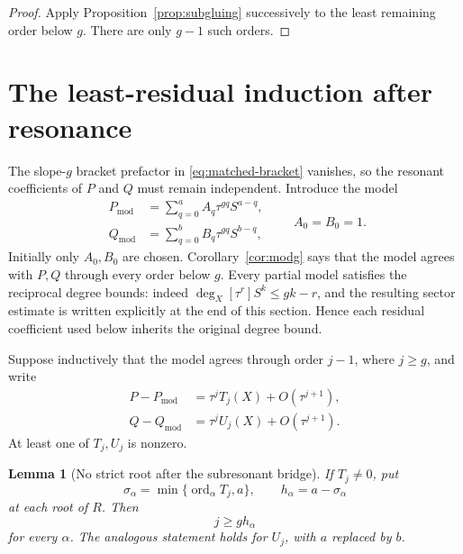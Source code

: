 \documentclass[11pt]{article}
\newtheorem{lemma}[theorem]{Lemma}
\theoremstyle{definition}
\theoremstyle{remark}
\newcommand{\ord}{\operatorname{ord}}
\begin{document}
\begin{proof}
Apply Proposition~\ref{prop:subgluing} successively to the least
remaining order below \(g\).  There are only \(g-1\) such orders.
\end{proof}

\section{The least-residual induction after resonance}
\label{sec:resonance}

The slope-\(g\) bracket prefactor in
\eqref{eq:matched-bracket} vanishes, so the resonant coefficients of
\(P\) and \(Q\) must remain independent.  Introduce the model
\begin{equation}
\begin{aligned}
 P_{\mathrm{mod}}
 &=\sum_{q=0}^{a}A_q\tau^{gq}S^{a-q},\\
 Q_{\mathrm{mod}}
 &=\sum_{q=0}^{b}B_q\tau^{gq}S^{b-q},
\end{aligned}
\qquad A_0=B_0=1.
\label{eq:model}
\end{equation}
Initially only \(A_0,B_0\) are chosen.  Corollary~\ref{cor:modg}
says that the model agrees with \(P,Q\) through every order below
\(g\).  Every partial model satisfies the reciprocal degree bounds:
indeed \(\deg_X[\tau^r]S^k\leq gk-r\), and the resulting sector
estimate is written explicitly at the end of this section.  Hence each
residual coefficient used below inherits the original degree bound.

Suppose inductively that the model agrees through order \(j-1\), where
\(j\geq g\), and write
\begin{equation}
\begin{aligned}
 P-P_{\mathrm{mod}}
 &=\tau^jT_j(X)+O(\tau^{j+1}),\\
 Q-Q_{\mathrm{mod}}
 &=\tau^jU_j(X)+O(\tau^{j+1}).
\end{aligned}
\label{eq:later-residual}
\end{equation}
At least one of \(T_j,U_j\) is nonzero.

\begin{lemma}[No strict root after the subresonant bridge]
\label{lem:no-strict-later}
If \(T_j\neq0\), put
\[
 \sigma_\alpha=\min\{\ord_\alpha T_j,a\},
 \qquad h_\alpha=a-\sigma_\alpha
\]
at each root of \(R\).  Then
\begin{equation}
 j\geq gh_\alpha
\label{eq:no-strict}
\end{equation}
for every \(\alpha\).  The analogous statement holds for \(U_j\), with
\(a\) replaced by \(b\).
\end{lemma}
\end{document}
